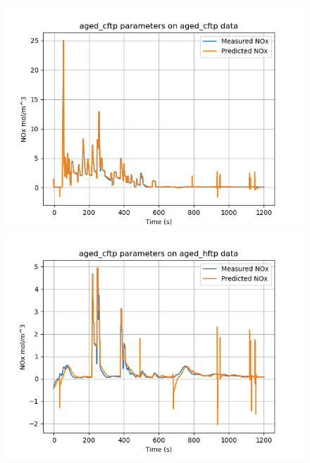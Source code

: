\begin{figure}[H]
        \begin{minipage}{0.33\textwidth}
                \includegraphics[width = \textwidth]{./figs/figs_new_mdl/aged_cftp_aged_cftp.png}
        \end{minipage}
        \begin{minipage}{0.33\textwidth}
                \includegraphics[width = \textwidth]{./figs/figs_new_mdl/aged_cftp_aged_hftp.png}
        \end{minipage}
        \begin{minipage}{0.33\textwidth}

\end{minipage}
\end{figure}
